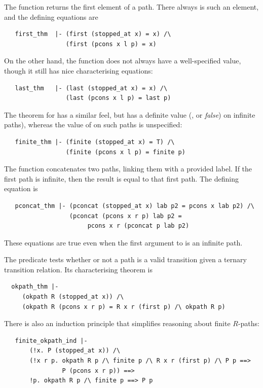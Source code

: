 The  function returns the first element of a path.
There always is such an element, and the defining equations are
\begin{hol}
\begin{verbatim}
   first_thm  |- (first (stopped_at x) = x) /\
                 (first (pcons x l p) = x)
\end{verbatim}
\end{hol}

On the other hand, the  function does not always have a
well-specified value, though it still has nice characterising
equations:
\begin{hol}
\begin{verbatim}
   last_thm   |- (last (stopped_at x) = x) /\
                 (last (pcons x l p) = last p)
\end{verbatim}
\end{hol}

The theorem for  has a similar feel, but has a definite
value (, or \emph{false}) on infinite paths), whereas the
value of \ml{last} on such paths is unspecified:
\begin{hol}
\begin{verbatim}
   finite_thm |- (finite (stopped_at x) = T) /\
                 (finite (pcons x l p) = finite p)
\end{verbatim}
\end{hol}

The function  concatenates two paths, linking them
with a provided label.  If the first path is infinite, then the result
is equal to that first path.  The defining equation is
\begin{hol}
\begin{verbatim}
   pconcat_thm |- (pconcat (stopped_at x) lab p2 = pcons x lab p2) /\
                  (pconcat (pcons x r p) lab p2 =
                       pcons x r (pconcat p lab p2)
\end{verbatim}
\end{hol}
%
These equations are true even when the first argument to
\ml{pconcat} is an infinite path.

The  predicate tests whether or not a path is a valid
transition given a ternary transition relation.  Its characterising
theorem is
\begin{hol}
\begin{verbatim}
  okpath_thm |-
     (okpath R (stopped_at x)) /\
     (okpath R (pcons x r p) = R x r (first p) /\ okpath R p)
\end{verbatim}
\end{hol}
%
There is also an induction principle that simplifies reasoning about
finite $R$-paths:
%
\begin{hol}
\begin{verbatim}
   finite_okpath_ind |-
       (!x. P (stopped_at x)) /\
       (!x r p. okpath R p /\ finite p /\ R x r (first p) /\ P p ==>
                P (pcons x r p)) ==>
       !p. okpath R p /\ finite p ==> P p
\end{verbatim}
\end{hol}


